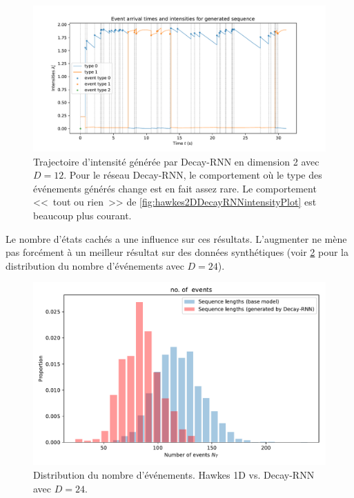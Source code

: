 \documentclass[../main.tex]{subfiles}
\begin{document}
\begin{figure}[htp]
	\includegraphics[width=\linewidth]{../results/intensity_Decay-RNN_2d_hidden12_20181201-003410_RARE_TYPESWITCH.pdf}
	\caption{Trajectoire d'intensité générée par Decay-RNN en dimension 2 avec $D=12$. Pour le réseau Decay-RNN, le comportement où le type des événements générés change est en fait assez rare. Le comportement <<~tout ou rien~>> de \cref{fig:hawkes2DDecayRNNintensityPlot} est beaucoup plus courant.}\label{fig:hawkes2DDecayRNNintensityPlotRareBehaviour}
\end{figure}


Le nombre d'états cachés a une influence sur ces résultats. L'augmenter ne mène pas forcément à un meilleur résultat sur des données synthétiques (voir \cref{fig:hawkes1DDecayRNNlengthDistribHidden24} pour la distribution du nombre d'événements avec $D=24$).

\begin{figure}[htp]
	\includegraphics[width=\linewidth]{../results/seq_length_distrib_Decay-RNN-1d-hidden_24-20181201-234619.pdf}
	\caption{Distribution du nombre d'événements. Hawkes 1D vs. Decay-RNN avec $D=24$.}\label{fig:hawkes1DDecayRNNlengthDistribHidden24}
\end{figure}
\end{document}
